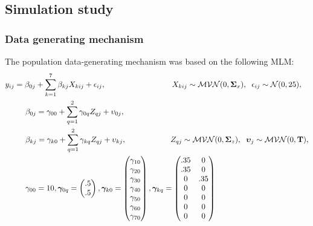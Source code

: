 \documentclass[10pt, a4paper, titlepage]{article}
\begin{document}
\subsection{Simulation study}
\subsubsection{Data generating mechanism}
The population data-generating mechanism was based on the following MLM:
\begin{subequations}
\label{eq:population}
\begin{align}
        y_{ij} &= \beta_{0j} + \sum_{k=1}^{7}\beta_{kj}X_{kij} + \epsilon_{ij}, \hspace{3cm} X_{kij} \sim \mathcal{MVN}(0, \boldsymbol{\Sigma}_{x}), \hspace{.2cm} \epsilon_{ij} \sim \mathcal{N}(0, 25), \label{eq:population1} \\
        &\hspace{.5cm}\beta_{0j} = \gamma_{00} + \sum_{q=1}^{2}\gamma_{0q}Z_{qj} + \upsilon_{0j}, \label{eq:beta0}\\
        &\hspace{.5cm}\beta_{kj} = \gamma_{k0} + \sum_{q=1}^{2}\gamma_{kq}Z_{qj} + \upsilon_{kj}, \hspace{2cm} Z_{qj} \sim \mathcal{MVN}(0, \boldsymbol{\Sigma}_{z}), \hspace{.2cm} \boldsymbol{\upsilon}_{j} \sim \mathcal{MVN}(0, \mathbf{T}), \label{eq:betak} \\
        &\hspace{.5cm}\gamma_{00} = 10, \boldsymbol{\gamma}_{0q} = \begin{pmatrix}
        .5 \\ .5
        \end{pmatrix}, \boldsymbol{\gamma}_{k0} = \begin{pmatrix}
        \gamma_{10} \\ \gamma_{20} \\ \gamma_{30} \\ \gamma_{40} \\ \gamma_{50} \\ \gamma_{60} \\ \gamma_{70}
        \end{pmatrix}, \boldsymbol{\gamma}_{kq} = \begin{pmatrix}
        .35 & 0 \\ .35 & 0 \\ 0 & .35 \\ 0 & 0 \\ 0 & 0 \\ 0 & 0 \\ 0 & 0

\end{pmatrix}
\end{align}
\end{subequations}
\end{document}
